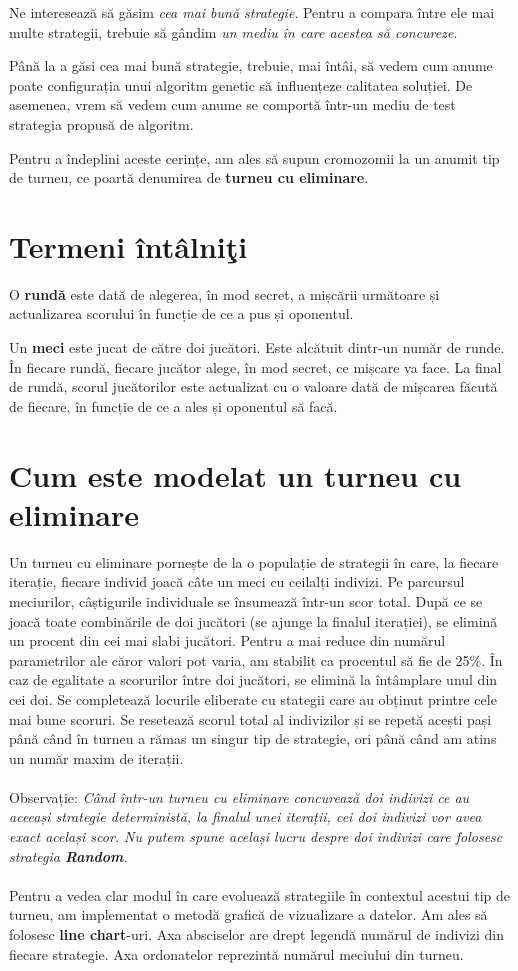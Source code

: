 Ne interesează să găsim \textit{cea mai bună strategie}. Pentru a compara între ele mai multe strategii, trebuie să gândim \textit{un mediu în care acestea să concureze}. 
 
Până la a găsi cea mai bună strategie, trebuie, mai întâi, să vedem cum anume poate configurația unui algoritm genetic să influențeze calitatea soluției. De asemenea, vrem să vedem cum anume se comportă într-un mediu de test strategia propusă de algoritm. 
 
Pentru a îndeplini aceste cerințe, am ales să supun cromozomii la un anumit tip de turneu, ce poartă denumirea de \textbf{turneu cu eliminare}.  

\section {Termeni întâlniţi}
O \textbf{rundă} este dată de alegerea, în mod secret, a mișcării următoare și actualizarea scorului în funcție de ce a pus și oponentul. 

Un \textbf{meci} este jucat de către doi jucători. Este alcătuit dintr-un număr de runde. În fiecare rundă, fiecare jucător alege, în mod secret, ce mișcare va face. La final de rundă, scorul jucătorilor este actualizat cu o valoare dată de mișcarea făcută de fiecare, în funcție de ce a ales și oponentul să facă. 

\section {Cum este modelat un turneu cu eliminare}
 
Un turneu cu eliminare pornește de la o populație de strategii în care, la fiecare iterație, fiecare individ joacă câte un meci cu ceilalți indivizi. Pe parcursul meciurilor, câștigurile individuale se însumează într-un scor total. După ce se joacă toate combinările de doi jucători (se ajunge la finalul iterației), se elimină un procent din cei mai slabi jucători.  Pentru a mai reduce din numărul parametrilor ale căror valori pot varia, am stabilit ca procentul să fie de 25\%. În caz de egalitate a scorurilor între doi jucători, se elimină la întâmplare unul din cei doi. Se completează locurile eliberate cu stategii care au obținut printre cele mai bune scoruri. Se resetează scorul total al indivizilor și se repetă acești pași până când în turneu a rămas un singur tip de strategie, ori până când am atins un număr maxim de iterații.  
\\\\
Observație: \textit{Când într-un turneu cu eliminare concurează doi indivizi ce au aceeași strategie deterministă, la finalul unei iterații, cei doi indivizi vor avea exact același scor. Nu putem spune același lucru despre doi indivizi care folosesc strategia \textbf{Random}.}
\\\\
Pentru a vedea clar modul în care evoluează strategiile în contextul acestui tip de turneu, am implementat o metodă grafică de vizualizare a datelor. Am ales să folosesc \textbf{line chart}-uri. Axa absciselor are drept legendă numărul de indivizi din fiecare strategie. Axa ordonatelor reprezintă numărul meciului din turneu.

